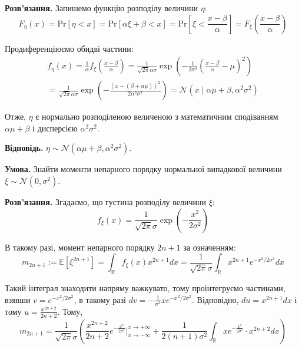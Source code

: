 \documentclass[oneside,solution]{karazin-prob-theory-assign}
\begin{document}
\textbf{Розв'язання.} Запишемо функцію розподілу величини $\eta$:
\begin{equation}
    F_{\eta}(x) = \text{Pr}[\eta < x] = \text{Pr}[\alpha \xi + \beta < x] = \text{Pr}\left[\xi < \frac{x-\beta}{\alpha}\right] = F_{\xi}\left(\frac{x-\beta}{\alpha}\right)
\end{equation}

Продиференціюємо обидві частини:
\begin{gather}
    f_{\eta}(x) = \frac{1}{\alpha}f_{\xi}\left(\frac{x-\beta}{\alpha}\right) = \frac{1}{\sqrt{2\pi}\alpha\sigma}\exp\left(-\frac{1}{2\sigma^2}\left(\frac{x-\beta}{\alpha}-\mu\right)^2\right) \nonumber \\
    = \frac{1}{\sqrt{2\pi}\alpha\sigma}\exp\left(-\frac{(x-(\beta+\alpha\mu))^2}{2\alpha^2\sigma^2}\right) = \mathcal{N}(x \mid \alpha\mu+\beta, \alpha^2\sigma^2)
\end{gather}

Отже, $\eta$ є нормально розподіленою величеною з математичним сподіванням $\alpha\mu+\beta$ і дисперсією $\alpha^2\sigma^2$.

\textbf{Відповідь.} $\eta \sim \mathcal{N}(\alpha\mu+\beta,\alpha^2\sigma^2)$.


\hspace{20px}\textbf{Умова.} Знайти моменти непарного порядку нормальної випадкової величини $\xi \sim \mathcal{N}(0,\sigma^2)$. 

\textbf{Розв'язання.} Згадаємо, що густина розподілу величини $\xi$:
\begin{equation}
    f_{\xi}(x) = \frac{1}{\sqrt{2\pi}\sigma} \exp \left(-\frac{x^2}{2\sigma^2}\right)
\end{equation}

В такому разі, момент непарного порядку $2n+1$ за означенням:
\begin{equation}
    m_{2n+1}:=\mathbb{E}[\xi^{2n+1}] = \int_{\mathbb{R}} f_{\xi}(x)x^{2n+1}dx = \frac{1}{\sqrt{2\pi}\sigma}\int_{\mathbb{R}} x^{2n+1}e^{-x^2/2\sigma^2}dx
\end{equation}

Такий інтеграл знаходити напряму важкувато, тому проінтегруємо частинами, взявши $v=e^{-x^2/2\sigma^2}$, в такому разі $dv = -\frac{1}{\sigma^2}xe^{-x^2/2\sigma^2}$. Відповідно, $du=x^{2n+1}dx$ і тому $u = \frac{x^{2n+2}}{2n+2}$. Тому,
\begin{equation}
    m_{2n+1} = \frac{1}{\sqrt{2\pi}\sigma}\left(\frac{x^{2n+2}}{2n+2}e^{-\frac{x^2}{2\sigma^2}}\Big|_{x \to -\infty}^{x \to +\infty} + \frac{1}{2(n+1)\sigma^2}\int_{\mathbb{R}}xe^{-\frac{x^2}{2\sigma^2}}\cdot x^{2n+2}dx\right)
\end{equation}
\end{document}
